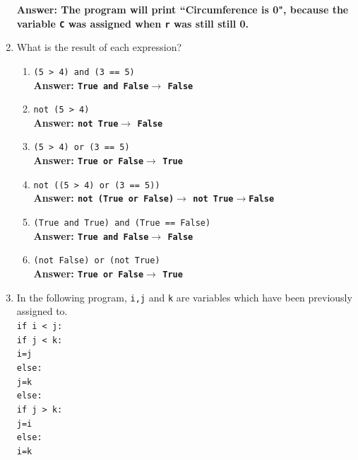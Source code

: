 \documentclass{article}
\begin{document}
\begin{enumerate}
{\color{ForestGreen}\bfseries Answer: 
The program will print ``Circumference is 0", because the variable \texttt{C} was assigned when \texttt{r} was still still 0.}
\item What is the result of each expression?\\
\begin{enumerate}
	\item \texttt{(5 > 4) and (3 == 5)}\\
	{\color{ForestGreen}\bfseries Answer: 
		\texttt{True and False}$\rightarrow$ \texttt{False}}
	\item \texttt{not (5 > 4) }\\
	{\color{ForestGreen}\bfseries Answer: 
		\texttt{not True}$\rightarrow$ \texttt{False}}
	\item \texttt{(5 > 4) or (3 == 5)}\\
	{\color{ForestGreen}\bfseries Answer: 
		\texttt{True or False}$\rightarrow$ \texttt{True}}
	\item \texttt{not ((5 > 4) or (3 == 5))}\\
	{\color{ForestGreen}\bfseries Answer: 
		\texttt{not (True or False)}$\rightarrow$ \texttt{not True}$\rightarrow$\texttt{False}}
	\item \texttt{(True and True) and (True == False)}\\
	{\color{ForestGreen}\bfseries Answer: 
		\texttt{True and False}$\rightarrow$ \texttt{False}}
	\item \texttt{(not False) or (not True)}\\
	{\color{ForestGreen}\bfseries Answer: 
		\texttt{True or False}$\rightarrow$ \texttt{True}}
\end{enumerate}
\item In the following program, \texttt{i,j} and \texttt{k} are variables which have been previously assigned to. \\
\texttt{if  i < j:}\\
\null\quad\texttt{if j < k:}\\
\null\quad\quad\texttt{i=j}\\
\null\quad\texttt{else:}\\
\null\quad\quad\texttt{j=k}\\
\texttt{else:}\\
\null\quad\texttt{if j > k:}\\
\null\quad\quad\texttt{j=i}\\
\null\quad\texttt{else:}\\
\null\quad\quad\texttt{i=k}\\

\end{enumerate}
\end{document}
